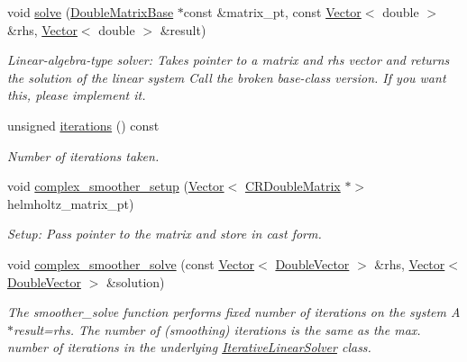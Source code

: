 \begin{DoxyCompactItemize}
void \hyperlink{classoomph_1_1ComplexGMRES_a9dd1695e8d907d57151df79a6e3e3968}{solve} (\hyperlink{classoomph_1_1DoubleMatrixBase}{Double\+Matrix\+Base} $\ast$const \&matrix\+\_\+pt, const \hyperlink{classoomph_1_1Vector}{Vector}$<$ double $>$ \&rhs, \hyperlink{classoomph_1_1Vector}{Vector}$<$ double $>$ \&result)
\begin{DoxyCompactList}\small\item\em Linear-\/algebra-\/type solver\+: Takes pointer to a matrix and rhs vector and returns the solution of the linear system Call the broken base-\/class version. If you want this, please implement it. \end{DoxyCompactList}\item 
unsigned \hyperlink{classoomph_1_1ComplexGMRES_a10760c61c62771773e2adc57055717aa}{iterations} () const
\begin{DoxyCompactList}\small\item\em Number of iterations taken. \end{DoxyCompactList}\item 
void \hyperlink{classoomph_1_1ComplexGMRES_a391b81dac92362f07b2cf80f3ba0821a}{complex\+\_\+smoother\+\_\+setup} (\hyperlink{classoomph_1_1Vector}{Vector}$<$ \hyperlink{classoomph_1_1CRDoubleMatrix}{C\+R\+Double\+Matrix} $\ast$$>$ helmholtz\+\_\+matrix\+\_\+pt)
\begin{DoxyCompactList}\small\item\em Setup\+: Pass pointer to the matrix and store in cast form. \end{DoxyCompactList}\item 
void \hyperlink{classoomph_1_1ComplexGMRES_a874520bc44cd8127497d972373938df9}{complex\+\_\+smoother\+\_\+solve} (const \hyperlink{classoomph_1_1Vector}{Vector}$<$ \hyperlink{classoomph_1_1DoubleVector}{Double\+Vector} $>$ \&rhs, \hyperlink{classoomph_1_1Vector}{Vector}$<$ \hyperlink{classoomph_1_1DoubleVector}{Double\+Vector} $>$ \&solution)
\begin{DoxyCompactList}\small\item\em The smoother\+\_\+solve function performs fixed number of iterations on the system A$\ast$result=rhs. The number of (smoothing) iterations is the same as the max. number of iterations in the underlying \hyperlink{classoomph_1_1IterativeLinearSolver}{Iterative\+Linear\+Solver} class. \end{DoxyCompactList}\end{DoxyCompactItemize}
